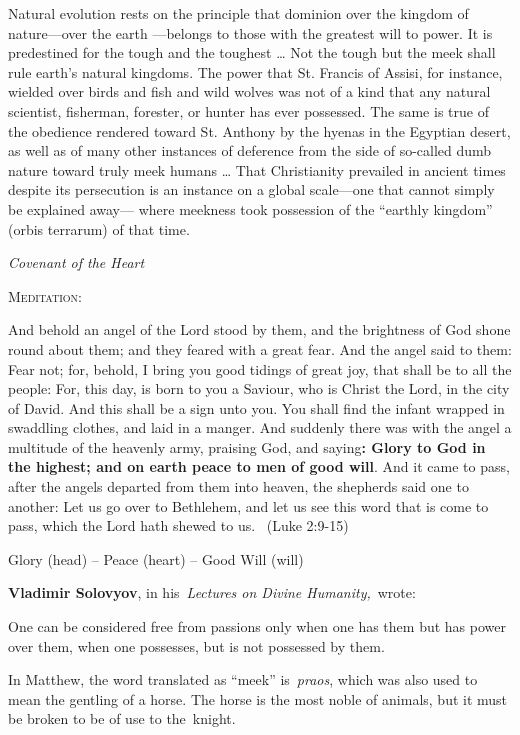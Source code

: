 \begin{quotationx}
Natural evolution rests on the principle that dominion over the kingdom of nature—over the earth
—belongs to those with the greatest will to power. It is predestined for the tough and the
toughest … Not the tough but the meek shall rule earth's natural kingdoms. The power that St.
Francis of Assisi, for instance, wielded over birds and fish and wild wolves was not of a kind that any natural
scientist, fisherman, forester, or hunter has ever possessed. The same is true of the obedience rendered toward St.
Anthony by the hyenas in the Egyptian desert, as well as of many other instances of deference from the side of
so-called dumb nature toward truly meek humans … That Christianity prevailed in ancient times despite its persecution
is an instance on a global scale—one that cannot simply be explained away—
where meekness took possession of the “earthly kingdom” (orbis terrarum) of that time. 
\begin{flushright}\textit{Covenant of the Heart}\end{flushright}

\end{quotationx}
\textsc{Meditation}:

And behold an angel of the Lord stood by them, and the brightness of God shone round about them; and they feared with a
great fear. And the angel said to them: Fear not; for, behold, I bring you good tidings of great joy, that shall be to
all the people: For, this day, is born to you a Saviour, who is Christ the Lord, in the city of David. And this shall
be a sign unto you. You shall find the infant wrapped in swaddling clothes, and laid in a manger. And suddenly there
was with the angel a multitude of the heavenly army, praising God, and saying\textbf{: Glory to God in the highest; and
on earth peace to men of good will}. And it came to pass, after the angels departed from them into heaven, the
shepherds said one to another: Let us go over to Bethlehem, and let us see this word that is come to pass, which the
Lord hath shewed to us.  (Luke 2:9-15)

Glory (head) – Peace (heart) – Good Will (will)

\textbf{Vladimir Solovyov}, in his \emph{Lectures on Divine Humanity,} wrote:

\begin{quotationx}
One can be considered free from passions only when one has them but has power over them, when one possesses, but is not
possessed by them.

\end{quotationx}
In Matthew, the word translated as “meek” is \emph{praos}, which was also used to mean the gentling of a horse. The
horse is the most noble of animals, but it must be broken to be of use to the knight.


